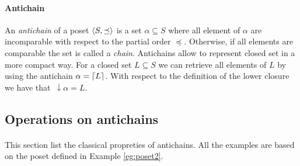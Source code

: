 \documentclass[11pt,a4paper]{article}
\DeclarePairedDelimiter{\ceil}{\lceil}{\rceil}
\DeclarePairedDelimiter{\tuple}{\langle}{\rangle}
\newcommand{\darrow}{\, \downarrow \!\!}
\theoremstyle{definition}
\begin{document}
\paragraph{Antichain}

An \textit{antichain} of a poset $\tuple{S, \preceq}$
is a set $\alpha \subseteq S$ where all element of $\alpha$
are incomparable with respect to the partial order $\preceq$.
Otherwise, if all elements are comparable the set is called a \textit{chain}.
Antichains allow to represent closed set in a more compact way.
For a closed set $L \subseteq S$ we can retrieve all elements of $L$ by using
the antichain $\alpha = \ceil{L}$. With respect
to the definition of the lower closure we have that $\darrow \alpha = L$.

\subsection{Operations on antichains}

\paragraph{}

This section list the classical propreties of antichains.
All the examples are based on the poset
defined in Example \ref{eg:poset2}.
\end{document}
